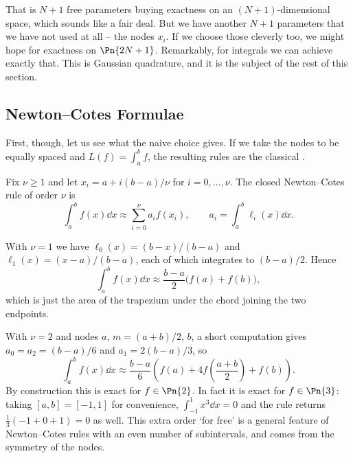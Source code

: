 That is $N+1$ free parameters buying exactness on an $(N+1)$-dimensional space, which sounds like a fair deal. But we have another $N+1$ parameters that we have not used at all -- the nodes $x_i$. If we choose those cleverly too, we might hope for exactness on $\Pn{2N+1}$. Remarkably, for integrals we can achieve exactly that. This is Gaussian quadrature, and it is the subject of the rest of this section.

\subsection{Newton--Cotes Formulae}

First, though, let us see what the naive choice gives. If we take the nodes to be equally spaced and $L(f) = \int_a^b f$, the resulting rules are the classical .

\begin{definition}
  Fix $\nu \ge 1$ and let $x_i = a + i(b-a)/\nu$ for $i = 0, \dots, \nu$. The closed Newton--Cotes rule of order $\nu$ is
  $$
  \int_a^b f(x)\dd x \approx \sum_{i=0}^{\nu} a_i f(x_i), \qquad a_i = \int_a^b \ell_i(x)\dd x .
  $$
\end{definition}

\begin{example}
  With $\nu = 1$ we have $\ell_0(x) = (b-x)/(b-a)$ and $\ell_1(x) = (x-a)/(b-a)$, each of which integrates to $(b-a)/2$. Hence
  $$
  \int_a^b f(x)\dd x \approx \frac{b-a}{2}\big(f(a) + f(b)\big),
  $$
  which is just the area of the trapezium under the chord joining the two endpoints.
\end{example}

\begin{example}
  With $\nu = 2$ and nodes $a$, $m = (a+b)/2$, $b$, a short computation gives $a_0 = a_2 = (b-a)/6$ and $a_1 = 2(b-a)/3$, so
  $$
  \int_a^b f(x)\dd x \approx \frac{b-a}{6}\left(f(a) + 4f\left(\frac{a+b}{2}\right) + f(b)\right).
  $$
  By construction this is exact for $f \in \Pn{2}$. In fact it is exact for $f \in \Pn{3}$: taking $[a,b] = [-1,1]$ for convenience, $\int_{-1}^1 x^3 \dd x = 0$ and the rule returns $\tfrac13(-1 + 0 + 1) = 0$ as well. This extra order `for free' is a general feature of Newton--Cotes rules with an even number of subintervals, and comes from the symmetry of the nodes.
\end{example}

